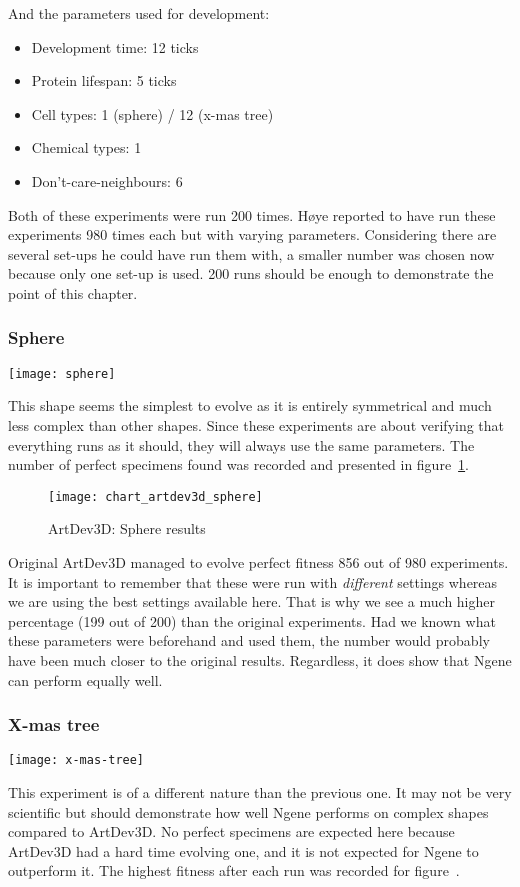 And the parameters used for development:

\begin{itemize}
	\itemsep=-2pt
	\item Development time: 12 ticks
	\item Protein lifespan: 5 ticks
	\item Cell types: 1 (sphere) / 12 (x-mas tree)
	\item Chemical types: 1
	\item Don't-care-neighbours: 6
\end{itemize}

Both of these experiments were run 200 times. H{\o}ye reported to have run these experiments 980 times each but with varying parameters. Considering there are several set-ups he could have run them with, a smaller number was chosen now because only one set-up is used. 200 runs should be enough to demonstrate the point of this chapter.

\subsubsection{Sphere}
\begin{center}\texttt{[image: sphere]}\end{center}
This shape seems the simplest to evolve as it is entirely symmetrical and much less complex than other shapes. Since these experiments are about verifying that everything runs as it should, they will always use the same parameters. The number of perfect specimens found was recorded and presented in figure~\ref{fig:chart_artdev3d_sphere}.

\begin{figure}[!ht]
	\centering
	\texttt{[image: chart\_artdev3d\_sphere]}
	\caption{ArtDev3D: Sphere results}
	\label{fig:chart_artdev3d_sphere}
\end{figure}

Original ArtDev3D managed to evolve perfect fitness 856 out of 980 experiments. It is important to remember that these were run with \emph{different} settings whereas we are using the best settings available here. That is why we see a much higher percentage (199 out of 200) than the original experiments. Had we known what these parameters were beforehand and used them, the number would probably have been much closer to the original results. Regardless, it does show that Ngene can perform equally well.

\subsubsection{X-mas tree}
\begin{center}\texttt{[image: x-mas-tree]}\end{center}
This experiment is of a different nature than the previous one. It may not be very scientific but should demonstrate how well Ngene performs on complex shapes compared to ArtDev3D. No perfect specimens are expected here because ArtDev3D had a hard time evolving one, and it is not expected for Ngene to outperform it. The highest fitness after each run was recorded for figure~\label{fig:chart_artdev3d_x-mas-tree}.

